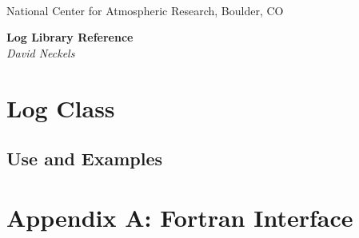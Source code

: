 \documentclass[]{article}
\begin{document}

\begin{titlepage}

\begin{latexonly}
 \\
\noindent National Center for Atmospheric Research, Boulder, CO \\
\vspace{2in}
\end{latexonly}

\begin{center}
{\Large\bf Log Library Reference} \\
{\it David Neckels}
\end{center}

\end{titlepage}

\tableofcontents

\newpage


%

\newpage
\section{Log Class}





\subsection{Use and Examples}




% 
%

\setcounter{section}{1}

\section*{Appendix A:  Fortran Interface}


\end{document}
